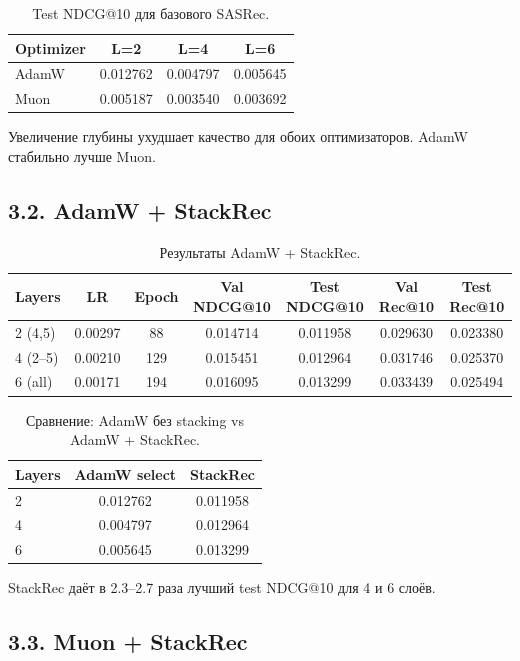 \documentclass[11pt,a4paper]{article}
\begin{document}
\begin{table}[H]
\centering
\begin{tabular}{lccc}
\toprule
Optimizer & L=2 & L=4 & L=6 \\
\midrule
AdamW & 0.012762 & 0.004797 & 0.005645 \\
Muon & 0.005187 & 0.003540 & 0.003692 \\
\bottomrule
\end{tabular}
\caption{Test NDCG@10 для базового SASRec.}
\end{table}

Увеличение глубины ухудшает качество для обоих оптимизаторов.
AdamW стабильно лучше Muon.

\subsection*{3.2. AdamW + StackRec}

\begin{table}[H]
\centering
\begin{tabular}{lcccccc}
\toprule
Layers & LR & Epoch & Val NDCG@10 & Test NDCG@10 & Val Rec@10 & Test Rec@10 \\
\midrule
2 (4,5) & 0.00297 & 88 & 0.014714 & 0.011958 & 0.029630 & 0.023380 \\
4 (2--5) & 0.00210 & 129 & 0.015451 & 0.012964 & 0.031746 & 0.025370 \\
6 (all) & 0.00171 & 194 & 0.016095 & 0.013299 & 0.033439 & 0.025494 \\
\bottomrule
\end{tabular}
\caption{Результаты AdamW + StackRec.}
\end{table}

\begin{table}[H]
\centering
\begin{tabular}{lcc}
\toprule
Layers & AdamW select & StackRec \\
\midrule
2 & 0.012762 & 0.011958 \\
4 & 0.004797 & 0.012964 \\
6 & 0.005645 & 0.013299 \\
\bottomrule
\end{tabular}
\caption{Сравнение: AdamW без stacking vs AdamW + StackRec.}
\end{table}

StackRec даёт в 2.3--2.7 раза лучший test NDCG@10 для 4 и 6 слоёв.

\subsection*{3.3. Muon + StackRec}
\end{document}
